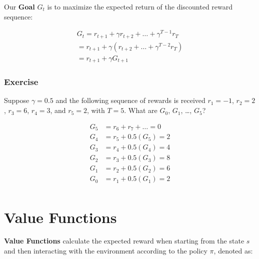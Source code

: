 \documentclass[
  letterpaper,
  DIV=11,
  numbers=noendperiod]{scrreprt}
\begin{document}
Our \textbf{Goal} \(G_{t}\) is to maximize the expected return of the
discounted reward sequence:

\[
\begin{aligned}
G_{t} = r_{t+1} + \gamma r_{t+2} + \ldots + \gamma^{T-1} r_{T} \\
     = r_{t+1} + \gamma (r_{t+2} + \ldots + \gamma^{T-2} r_{T}) \\
     = r_{t+1} + \gamma G_{t+1} 
\end{aligned}
\]

\subsubsection{Exercise}\label{exercise-8}

Suppose \(\gamma = 0.5\) and the following sequence of rewards is
received \(r_{1} = -1\), \(r_{2} = 2\), \(r_{3} = 6\), \(r_{4} = 3\),
and \(r_{5} = 2\), with \(T = 5\). What are \(G_{0}\), \(G_{1}\),
\ldots, \(G_{5}\)?

\begin{tcolorbox}[enhanced jigsaw, toprule=.15mm, leftrule=.75mm, coltitle=black, left=2mm, opacityback=0, titlerule=0mm, arc=.35mm, toptitle=1mm, opacitybacktitle=0.6, bottomtitle=1mm, colframe=quarto-callout-tip-color-frame, title=\textcolor{quarto-callout-tip-color}{\faLightbulb}\hspace{0.5em}{Solution}, rightrule=.15mm, bottomrule=.15mm, colbacktitle=quarto-callout-tip-color!10!white, breakable, colback=white]

\[
\begin{aligned}
G_{5} &= r_{6} + r_{7} + \dots = 0 \\
G_{4} &= r_{5} + 0.5(G_{5}) = 2 \\
G_{3} &= r_{4} + 0.5(G_{4}) = 4 \\
G_{2} &= r_{3} + 0.5(G_{3}) = 8 \\
G_{1} &= r_{2} + 0.5(G_{2}) = 6 \\
G_{0} &= r_{1} + 0.5(G_{1}) = 2 \\
\end{aligned}
\]

\end{tcolorbox}

\section{Value Functions}\label{value-functions}

\textbf{Value Functions} calculate the expected reward when starting
from the state \(s\) and then interacting with the environment according
to the policy \(\pi\), denoted as:
\end{document}
